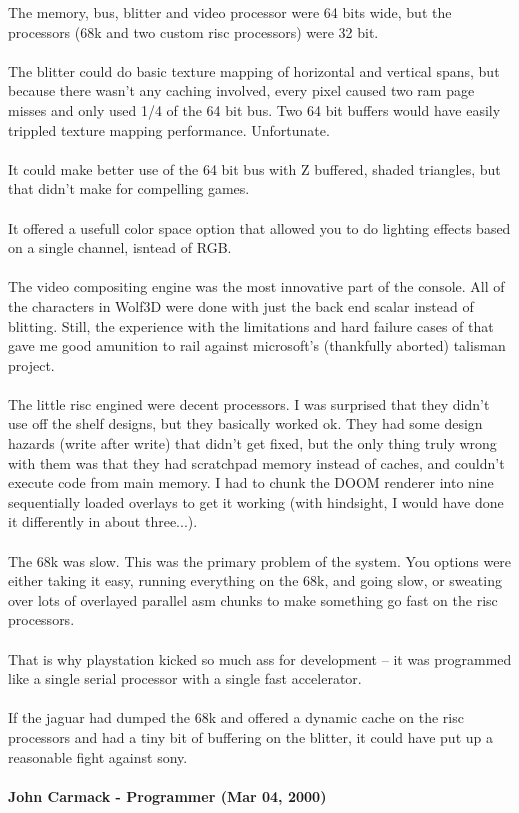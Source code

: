 \documentclass[book.tex]{subfiles}
\begin{document}
\begin{fancyquotes}
The memory, bus, blitter and video processor were 64 bits wide, but the processors (68k and two custom risc processors) were 32 bit.\\
\\
The blitter could do basic texture mapping of horizontal and vertical spans, but because there wasn't any caching involved, every pixel caused two ram page misses and only used 1/4 of the 64 bit bus. Two 64 bit buffers would have easily trippled texture mapping performance. Unfortunate.\\
\\
It could make better use of the 64 bit bus with Z buffered, shaded triangles, but that didn't make for compelling games.\\
\\
It offered a usefull color space option that allowed you to do lighting effects based on a single channel, isntead of RGB.\\
\\
The video compositing engine was the most innovative part of the console. All of the characters in Wolf3D were done with just the back end scalar instead of blitting. Still, the experience with the limitations and hard failure cases of that gave me good amunition to rail against microsoft's (thankfully aborted) talisman project.\\
\\
The little risc engined were decent processors. I was surprised that they didn't use off the shelf designs, but they basically worked ok. They had some design hazards (write after write) that didn't get fixed, but the only thing truly wrong with them was that they had scratchpad memory instead of caches, and couldn't execute code from main memory. I had to chunk the DOOM renderer into nine sequentially loaded overlays to get it working (with hindsight, I would have done it differently in about three...).\\
\\
The 68k was slow. This was the primary problem of the system. You options were either taking it easy, running everything on the 68k, and going slow, or sweating over lots of overlayed parallel asm chunks to make something go fast on the risc processors.\\
\\
That is why playstation kicked so much ass for development -- it was programmed like a single serial processor with a single fast accelerator.\\
\\
If the jaguar had dumped the 68k and offered a dynamic cache on the risc processors and had a tiny bit of buffering on the blitter, it could have put up a reasonable fight against sony.\\
\\
\textbf{John Carmack - Programmer (Mar 04, 2000)}
\end{fancyquotes}
\end{document}

